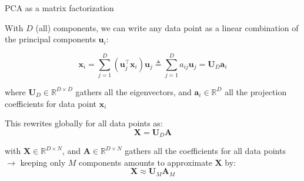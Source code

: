 \documentclass{beamer}
\begin{document}
\begin{frame}{PCA as a matrix factorization}

With $D$ (all) components, we can write any data point as a linear combination of the principal components $\mathbf{u}_i$:

\begin{equation*}
\mathbf{x}_{i} = \sum_{j=1}^{D} (\mathbf{u}_{j}^{\top}\mathbf{x}_{i})\mathbf{u}_{j} \triangleq  \sum_{j=1}^{D} a_{ij}\mathbf{u}_{j} = \mathbf{U}_{D}\mathbf{a}_{i}
\end{equation*}

where $\mathbf{U}_{D} \in \mathbb{R}^{D\times D}$ gathers all the eigenvectors, and $\mathbf{a}_{i} \in \mathbb{R}^{D}$ all the projection coefficients for data point $\mathbf{x}_{i}$\\
\vspace{0.2cm}

This rewrites globally for all data points as:
\begin{equation*}
\mathbf{X} = \mathbf{U}_{D}\mathbf{A}
\end{equation*}

with $\mathbf{X} \in \mathbb{R}^{D\times N}$, and $\mathbf{A} \in \mathbb{R}^{D\times N}$ gathers all the coefficients for all data points\\
\vspace{0.2cm}
$\rightarrow$ keeping only $M$ components amounts to approximate $\mathbf{X}$ by:
\begin{equation*}
\mathbf{X} \approx \mathbf{U}_{M}\mathbf{A}_{M}
\end{equation*}

\end{frame}
\end{document}
